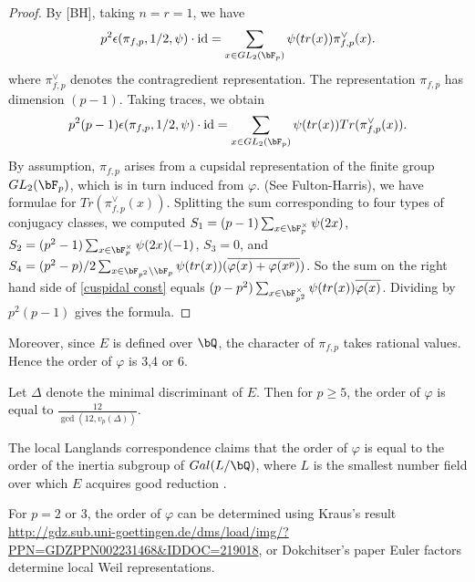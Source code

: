\documentclass [11pt, proquest] {uwthesis}[2015/03/03]
\begin{document}
\begin{proof}
By [BH], taking $n =  r = 1$, we have 
\begin{equation} 
	p^2 \epsilon(\pi_{f,p}, 1/2, \psi) \cdot \text{id} = \sum_{x \in GL_2(\bF_p)} \psi(tr(x)) \pi_{f,p}^{\vee}(x).
\end{equation}
where $\pi_{f,p}^{\vee}$ denotes the contragredient representation. The representation $\pi_{f,p}$ has dimension $(p-1)$.
Taking traces, we obtain 
\begin{equation} \label{cuspidal const}
	p^2 (p-1) \epsilon(\pi_{f,p}, 1/2, \psi) \cdot \text{id} = \sum_{x \in GL_2(\bF_p)} \psi(tr(x)) Tr(\pi_{f,p}^{\vee}(x)).
\end{equation}
By assumption, $\pi_{f,p}$ arises from a cupsidal representation of the finite group $GL_2(\bF_p)$, which is in turn induced from $\varphi$. (See Fulton-Harris), we have formulae for $Tr(\pi_{f,p}^{\vee}(x))$. Splitting the sum corresponding to four types of conjugacy classes, we computed $S_1 =  (p-1)  \sum_{x \in \bF_p^{\times}} \psi(2x)$, $S_2 = (p^2-1) \sum_{x \in \bF_p^{\times}} \psi(2x) (-1)$, $S_3 = 0$, and $S_4=  (p^2-p)/2 \sum_{x \in \bF_{p^2} \setminus \bF_p} \psi(tr(x))(\overline{\varphi(x) + \varphi(x^p)})$. So the sum on the right hand side of \ref{cuspidal const}  equals $(p-p^2) \sum_{x \in \bF_{p^2}^{\times}} \psi(tr(x)) \overline{\varphi(x)}$. Dividing by $p^2(p-1)$ gives the formula.

\end{proof}

Moreover, since $E$ is defined over $\bQ$, the character of $\pi_{f,p}$ takes rational values. Hence the order of $\varphi$ is 3,4 or 6. 

\begin{Lemma}
Let $\Delta$ denote the minimal discriminant of $E$. Then for $p \geq 5$, the order of $\varphi$ is equal to 
$\frac{12}{\gcd(12, v_p(\Delta))}$.
\end{Lemma}

The local Langlands correspondence claims that the order of $\varphi$ is equal to the order of the inertia subgroup 
of $Gal(L/\bQ)$, where $L$ is the smallest number field over which $E$ acquires good reduction .

For $p = 2$ or $3$, the order of $\varphi$ can be determined using Kraus's result \url{http://gdz.sub.uni-goettingen.de/dms/load/img/?PPN=GDZPPN002231468&IDDOC=219018}, or Dokchitser's paper Euler factors determine local Weil representations. 
\end{document}
